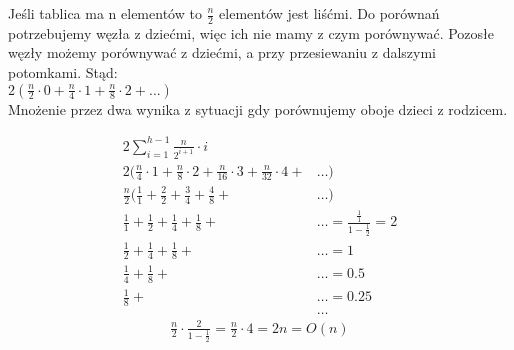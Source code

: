 \documentclass[18pt]{extarticle}
\begin{document}
Jeśli tablica ma n elementów to $\frac{n}{2}$ elementów jest liśćmi. Do porównań potrzebujemy węzła z dziećmi, więc ich nie mamy z czym porównywać. Pozosłe węzły możemy porównywać z dziećmi, a przy przesiewaniu z dalszymi potomkami. Stąd: \\

$2(\frac{n}{2} \cdot 0 + \frac{n}{4} \cdot 1 + \frac{n}{8} \cdot 2 + ...)$ \\

Mnożenie przez dwa wynika z sytuacji gdy porównujemy oboje dzieci z rodzicem.

\begin{align*}
    2 \sum_{i=1}^{h-1} \frac{n}{2^{i+1}} \cdot i                                                 &                                               \\
    2 (\frac{n}{4} \cdot 1 + \frac{n}{8} \cdot 2 + \frac{n}{16} \cdot 3 + \frac{n}{32} \cdot 4 + & \dots)                                        \\
    \frac{n}{2} (\frac{1}{1} + \frac{2}{2} + \frac{3}{4} + \frac{4}{8} +                         & \dots)                                        \\
    \frac{1}{1} +  \frac{1}{2} +  \frac{1}{4} +  \frac{1}{8} +                                   & \dots = \frac{\frac{1}{1}}{1-\frac{1}{2}} = 2 \\
    \frac{1}{2} +  \frac{1}{4} +  \frac{1}{8} +                                                  & \dots = 1                                     \\
    \frac{1}{4} +  \frac{1}{8} +                                                                 & \dots = 0.5                                   \\
    \frac{1}{8} +                                                                                & \dots = 0.25                                  \\
                                                                                                 & \dots
\end{align*}
\begin{gather*}
    \frac{n}{2} \cdot \frac{2}{1-\frac{1}{2}} = \frac{n}{2} \cdot 4 = 2n = O(n)
\end{gather*}
\end{document}
